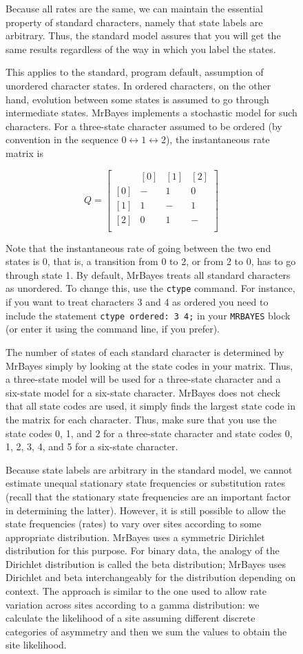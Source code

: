\documentclass[12pt]{book}
\newcommand{\ttt}[1]{\texttt{#1}}
\begin{document}
\begin{figure}[h]
Because all rates are the same, we can maintain the essential property of standard characters,
namely that state labels are arbitrary. Thus, the standard model assures that you will get the same
results regardless of the way in which you label the states.

This applies to the standard, program default, assumption of unordered character states. In ordered
characters, on the other hand, evolution between some states is assumed to go through intermediate
states. MrBayes implements a stochastic model for such characters. For a three-state character
assumed to be ordered (by convention in the sequence $0 \leftrightarrow 1 \leftrightarrow 2$), the
instantaneous rate matrix is

\[
Q=\begin{bmatrix}
    & [0] & [1] & [2]\\
 [0]& - & 1 & 0\\
 [1]& 1& -  & 1\\
 [2]& 0& 1  & -\\
\end{bmatrix}
\]

Note that the instantaneous rate of going between the two end states is 0, that is, a transition
from 0 to 2, or from 2 to 0, has to go through state 1. By default, MrBayes treats all standard
characters as unordered. To change this, use the \ttt{ctype} command. For instance, if you want to
treat characters 3 and 4 as ordered you need to include the statement \ttt{ctype ordered: 3 4;} in
your \ttt{MRBAYES} block (or enter it using the command line, if you prefer).

The number of states of each standard character is determined by MrBayes simply by looking at the
state codes in your matrix. Thus, a three-state model will be used for a three-state character and
a six-state model for a six-state character. MrBayes does not check that all state codes are used,
it simply finds the largest state code in the matrix for each character. Thus, make sure that you
use the state codes 0, 1, and 2 for a three-state character and state codes 0, 1, 2, 3, 4, and 5
for a six-state character.

Because state labels are arbitrary in the standard model, we cannot estimate unequal stationary
state frequencies or substitution rates (recall that the stationary state frequencies are an
important factor in determining the latter). However, it is still possible to allow the state
frequencies (rates) to vary over sites according to some appropriate distribution. MrBayes uses a
symmetric Dirichlet distribution for this purpose. For binary data, the analogy of the Dirichlet
distribution is called the beta distribution; MrBayes uses Dirichlet and beta interchangeably for
the distribution depending on context. The approach is similar to the one used to allow rate
variation across sites according to a gamma distribution: we calculate the likelihood of a site
assuming different discrete categories of asymmetry and then we sum the values to obtain the site
likelihood.


\end{figure}
\end{document}
